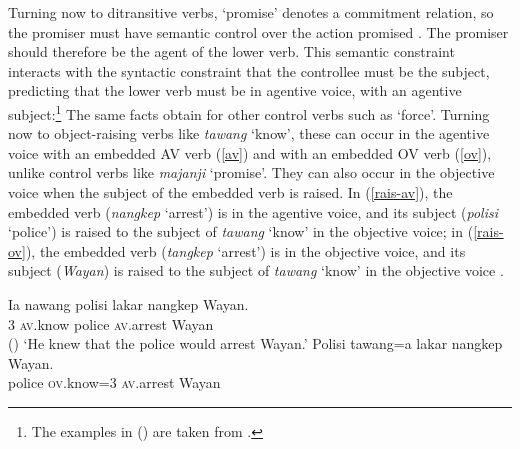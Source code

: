 Turning now to ditransitive verbs,  `promise' denotes a commitment relation, so the promiser must have
semantic control over the action promised \parencites{Farkas1988,Kroeger1993}[]{SagandPollard1991}\addpages. The
promiser should therefore be the agent of the lower verb. This semantic constraint interacts
with the syntactic constraint that the controllee must be the subject, predicting that the
lower verb must be in agentive voice, with an agentive subject:\footnote{%
  The examples in () are taken from .
}
\eal
{}
\zl
The same facts obtain for other control verbs such as  `force'.
Turning now to object-raising verbs like \emph{tawang} `know',  these can occur in the agentive
voice with an embedded AV verb (\ref{av}) and with an embedded OV verb (\ref{ov}), unlike control
verbs like \emph{majanji} `promise'. 
They can also occur in the objective voice when the subject of the embedded verb is raised.  In
(\ref{rais-av}), the embedded verb (\emph{nangkep} `arrest') is in the agentive voice, and its
subject (\emph{polisi} `police') is raised to the subject of \emph{tawang} `know' in the objective
voice; in (\ref{rais-ov}), the embedded verb (\emph{tangkep} `arrest') is in the objective voice, and
its subject (\emph{Wayan}) is raised to the subject of \emph{tawang} `know' in the objective voice \citep[ex 23]{WechslerandArka1998}.

\eal
\ex 
\label{av}
\gll Ia nawang          polisi lakar  nangkep            Wayan. \\
     3 \textsc{av}.know police \FUT{} \textsc{av}.arrest Wayan \\\hfill()
\glt `He knew that the police would arrest Wayan.'
\ex
\label{rais-av} 
\gll Polisi tawang=a           lakar  nangkep            Wayan. \\
     police \textsc{ov}.know=3 \FUT{} \textsc{av}.arrest Wayan\\


